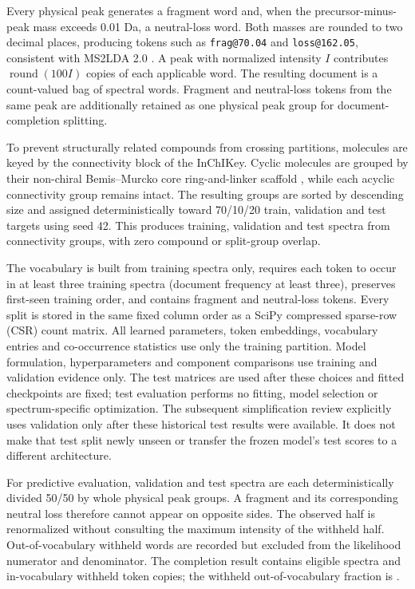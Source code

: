 \documentclass[10pt,a4paper]{article}
\begin{document}
Every physical peak generates a fragment word and, when the
precursor-minus-peak mass exceeds 0.01 Da, a neutral-loss word. Both masses are
rounded to two decimal places, producing tokens such as
\texttt{frag@70.04} and \texttt{loss@162.05}, consistent with MS2LDA 2.0
\cite{torresortega2026}. A peak with normalized intensity $I$ contributes
$\operatorname{round}(100I)$ copies of each applicable word. The resulting
document is a count-valued bag of spectral words. Fragment and neutral-loss
tokens from the same peak are additionally retained as one physical peak group
for document-completion splitting.

To prevent structurally related compounds from crossing partitions, molecules
are keyed by the connectivity block of the InChIKey. Cyclic molecules are
grouped by their non-chiral Bemis--Murcko core ring-and-linker scaffold
\cite{bemismurcko1996}, while
each acyclic connectivity group remains intact. The \SplitGroups{} resulting
groups are sorted by descending size and assigned deterministically toward
70/10/20 train, validation and test targets using seed 42. This produces
\TrainingSpectra{} training, \ValidationSpectra{} validation and
\TestSpectra{} test spectra from \ConnectivityGroups{} connectivity groups,
with zero compound or split-group overlap.

The vocabulary is built from training spectra only, requires each token to
occur in at least three training spectra (document frequency at least three),
preserves first-seen training order, and contains
\VocabularySize{} fragment and neutral-loss tokens. Every split is stored in
the same fixed column order as a SciPy compressed sparse-row (CSR) count matrix.
All learned parameters, token embeddings, vocabulary entries and co-occurrence
statistics use only the training partition. Model formulation, hyperparameters
and component comparisons use training and validation evidence only. The test
matrices are used after these choices and fitted checkpoints are fixed; test
evaluation performs no fitting, model selection or spectrum-specific
optimization. The subsequent simplification review explicitly uses validation
only after these historical test results were available. It does not make
that test split newly unseen or transfer the frozen model's test scores to a
different architecture.

For predictive evaluation, validation and test spectra are each deterministically
divided 50/50 by whole physical peak groups. A fragment and its corresponding neutral
loss therefore cannot appear
on opposite sides. The observed half is renormalized without consulting the
maximum intensity of the withheld half. Out-of-vocabulary withheld words are
recorded but excluded from the likelihood numerator and denominator. The
completion result contains \CompletionDocuments{} eligible spectra and
\CompletionTokens{} in-vocabulary withheld token copies; the withheld
out-of-vocabulary fraction is \CompletionOOV{}.
\end{document}
